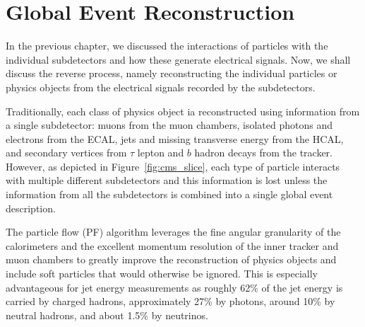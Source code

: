 \chapter{Global Event Reconstruction}


In the previous chapter, we discussed the interactions of particles with the individual subdetectors and how these generate electrical signals.
Now, we shall discuss the reverse process, namely reconstructing the individual particles or physics objects from the electrical signals recorded by the subdetectors.

Traditionally, each class of physics object ia reconstructed using information from a single subdetector: muons from the muon chambers, isolated photons and electrons from the ECAL, jets and missing transverse energy from the HCAL, and secondary vertices from $\tau$ lepton and $b$ hadron decays from the tracker.
However, as depicted in Figure~\ref{fig:cms_slice}, each type of particle interacts with multiple different subdetectors and this information is lost unless the information from all the subdetectors is combined into a single global event description.

The particle flow (PF) algorithm leverages the fine angular granularity of the calorimeters and the excellent momentum resolution of the inner tracker and muon chambers to greatly improve the reconstruction of physics objects and include soft particles that would otherwise be ignored.
This is especially advantageous for jet energy measurements as roughly 62\% of the jet energy is carried by charged hadrons, approximately 27\% by photons, around 10\% by neutral hadrons, and about 1.5\% by neutrinos.

